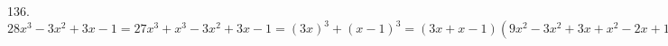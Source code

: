 136. $28x^3-3x^2+3x-1=27x^3+x^3-3x^2+3x-1=(3x)^3+(x-1)^3=(3x+x-1)(9x^2-3x^2+3x+x^2-2x+1)=(4x-1)(7x^2+x+1).$\\
